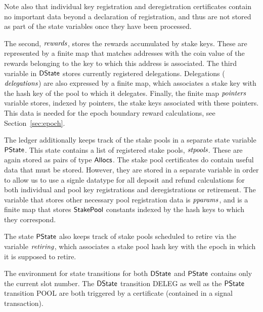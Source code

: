 Note also that individual key registration
and deregistration certificates contain no important data beyond a declaration
of registration, and thus are not stored as part of the state variables once
they have been processed.

The second, $\mathit{rewards}$, stores the
rewards accumulated by stake keys. These are represented by
a finite
map that matches addresses with the coin value of the rewards belonging to the
key to which this address is associated. The third
variable in $\mathsf{DState}$ stores currently registered delegations.
Delegations ($\mathit{delegations}$) are also expressed by a finite map, which
associates a stake key with the hash key of the pool to which it delegates.
Finally, the finite map $\mathit{pointers}$ variable stores,
indexed by pointers,
the stake keys associated with these pointers. This data is needed for the
epoch boundary reward calculations, see Section~\ref{sec:epoch}.

The ledger additionally keeps track of the stake pools in a separate state variable
$\mathsf{PState}$.
This state contains a list of registered stake pools, $\mathit{stpools}$.
These are again stored as pairs of type $\mathsf{Allocs}$. The stake pool certificates
do contain useful data that must be stored. However, they are stored in a
separate variable in order to allow us to use a signle datatype for
all deposit and refund calculations for both individual and pool key registrations
and deregistrations or retirement. The variable that stores other necessary pool
registration data is $\mathit{pparams}$, and is a finite map that stores $\mathsf{StakePool}$
constants indexed
by the hash keys to which they correspond.

The state $\mathsf{PState}$ also keeps track of
stake pools scheduled to retire via the variable $\mathit{retiring}$,
which associates
a stake pool hash key with the epoch in which it is supposed to retire.

The environment for state transitions for both $\mathsf{DState}$ and $\mathsf{PState}$ contains
only the current slot number. The $\mathsf{DState}$ transition DELEG as well as
the $\mathsf{PState}$ transition POOL are both triggered by a
certificate (contained in a signal transaction).


